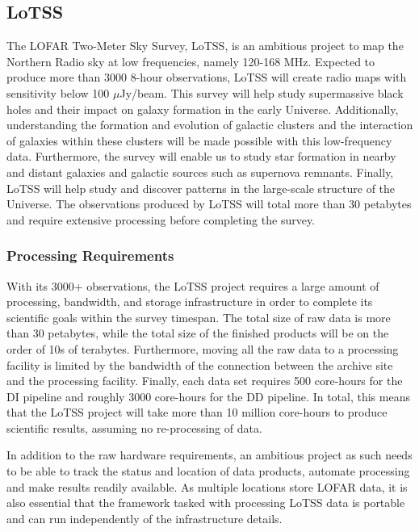 \subsection{LoTSS} 

The LOFAR Two-Meter Sky Survey, \Gls{LoTSS}, is an ambitious project to map the Northern Radio sky at low frequencies, namely 120-168 MHz. Expected to produce more than 3000 8-hour observations, LoTSS will create radio maps with sensitivity below 100 $\mu$Jy/beam. This survey will help study supermassive black holes and their impact on galaxy formation in the early Universe. Additionally, understanding the formation and evolution of galactic clusters and the interaction of galaxies within these clusters will be made possible with this low-frequency data. Furthermore, the survey will enable us to study star formation in nearby and distant galaxies and galactic sources such as supernova remnants. Finally, LoTSS will help study and discover patterns in the large-scale structure of the Universe.  The observations produced by LoTSS will total more than 30 petabytes and require extensive processing before completing the survey. 

\subsubsection{Processing Requirements}   

With its 3000+ observations, the LoTSS project requires a large amount of processing, bandwidth, and storage infrastructure in order to complete its scientific goals within the survey timespan. The total size of raw data is more than 30 petabytes, while the total size of the finished products will be on the order of 10s of terabytes. Furthermore, moving all the raw data to a processing facility is limited by the bandwidth of the connection between the archive site and the processing facility. Finally, each data set requires 500 core-hours for the DI pipeline and roughly 3000 core-hours for the DD pipeline. In total,  this means that the LoTSS project will take more than 10 million core-hours to produce scientific results, assuming no re-processing of data. 
 
In addition to the raw hardware requirements, an ambitious project as such needs to be able to track the status and location of data products, automate processing and make results readily available. As multiple locations store LOFAR data,  it is also essential that the framework tasked with processing LoTSS data is portable and can run independently of the infrastructure details.



